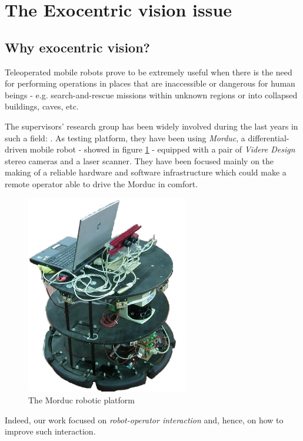 \section{The Exocentric vision issue}
\label{sec:exo}
\subsection{Why exocentric vision?}
Teleoperated mobile robots prove to be extremely useful 
when there is the need for performing operations in places that 
are inaccessible or dangerous for human beings - e.g. 
search-and-rescue missions within unknown regions or into 
collapsed buildings, caves, etc.
%

%
The supervisors' research group has been widely involved 
during the last years in such a field: \cite{livatino2010}.
%
As testing platform, they have been using \textit{Morduc},
a differential-driven mobile robot - showed in figure \ref{fig:Morduc} -
equipped with a pair of \textit{Videre Design} \cite{videredesign} 
stereo cameras and a laser scanner. They have been focused 
mainly on the making of a reliable hardware and software 
infrastructure which could make a remote operator able to drive 
the Morduc in comfort.
%
\begin{figure}[!h]
  \begin{center}
    \includegraphics[width=200pt]{img/3morduc.jpg}
    \caption{The Morduc robotic platform}
    \label{fig:Morduc}
  \end{center}
\end{figure}
%
Indeed, our work focused on \textit{robot-operator interaction} and, 
hence, on how to improve such interaction. 
%

